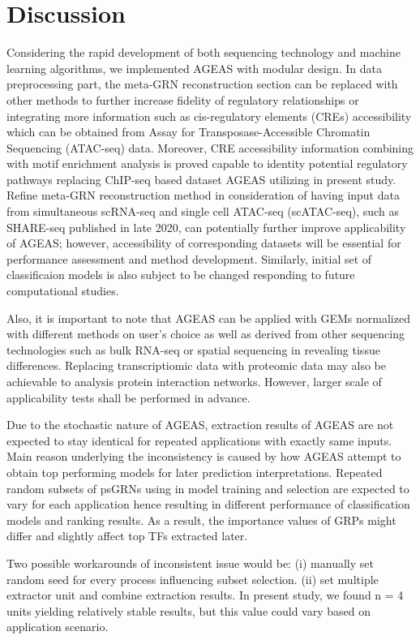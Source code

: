 \documentclass[fleqn,10pt]{wlscirep}
\begin{document}
\section*{Discussion}
  \label{disc}
  Considering the rapid development of both sequencing technology and machine learning algorithms, we implemented
  AGEAS with modular design.
  In data preprocessing part, the meta-GRN reconstruction section can be replaced with other methods to further increase fidelity of regulatory relationships or integrating more information such as cis-regulatory elements (CREs) accessibility which can be obtained from Assay for Transposase-Accessible Chromatin Sequencing (ATAC-seq) data.
  Moreover, CRE accessibility information combining with motif enrichment analysis is proved capable to identity potential regulatory pathways replacing ChIP-seq based dataset AGEAS utilizing in present study. \cite{scREMOTE}
  Refine meta-GRN reconstruction method in consideration of having input data from simultaneous scRNA-seq and single cell ATAC-seq (scATAC-seq), such as SHARE-seq published in late 2020, \cite{share_seq} can potentially further improve applicability of AGEAS; however, accessibility of corresponding datasets will be essential for performance assessment and method development.
  Similarly, initial set of classificaion models is also subject to be changed responding to future computational studies.

  Also, it is important to note that AGEAS can be applied with GEMs normalized with different methods on user's choice as well as derived from other sequencing technologies such as bulk RNA-seq or spatial sequencing in revealing tissue differences.
  Replacing transcriptiomic data with proteomic data may also be achievable to analysis protein interaction networks.
  However, larger scale of applicability tests shall be performed in advance.

  Due to the stochastic nature of AGEAS, extraction results of AGEAS are not expected to stay identical for repeated applications with exactly same inputs.
  Main reason underlying the inconsistency is caused by how AGEAS attempt to obtain top performing models for later prediction interpretations.
  Repeated random subsets of psGRNs using in model training and selection are expected to vary for each application hence resulting in different performance of classification models and ranking results.
  As a result, the importance values of GRPs might differ and slightly affect top TFs extracted later.

  Two possible workarounds of inconsistent issue would be:
  (i) manually set random seed for every process influencing subset selection.
  (ii) set multiple extractor unit and combine extraction results.
  In present study, we found n = 4 units yielding relatively stable results, but this value could vary based on application scenario.
\end{document}
